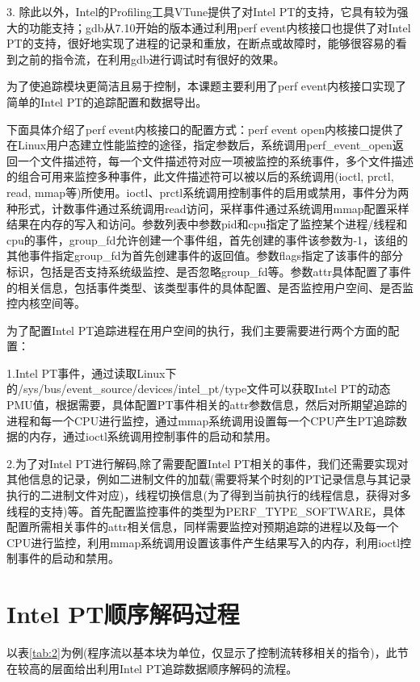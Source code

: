 3. 除此以外，Intel的Profiling工具VTune提供了对Intel PT的支持，它具有较为强大的功能支持；gdb从7.10开始的版本通过利用perf event内核接口也提供了对Intel PT的支持，很好地实现了进程的记录和重放，在断点或故障时，能够很容易的看到之前的指令流，在利用gdb进行调试时有很好的效果。

为了使追踪模块更简洁且易于控制，本课题主要利用了perf event内核接口实现了简单的Intel PT的追踪配置和数据导出。

下面具体介绍了perf event内核接口的配置方式：perf event open内核接口提供了在Linux用户态建立性能监控的途径，指定参数后，系统调用perf\_event\_open返回一个文件描述符，每一个文件描述符对应一项被监控的系统事件，多个文件描述的组合可用来监控多种事件，此文件描述符可以被以后的系统调用(ioctl, prctl, read, mmap等)所使用。ioctl、prctl系统调用控制事件的启用或禁用，事件分为两种形式，计数事件通过系统调用read访问，采样事件通过系统调用mmap配置采样结果在内存的写入和访问。参数列表中参数pid和cpu指定了监控某个进程/线程和cpu的事件，group\_fd允许创建一个事件组，首先创建的事件该参数为-1，该组的其他事件指定group\_fd为首先创建事件的返回值。参数flags指定了该事件的部分标识，包括是否支持系统级监控、是否忽略group\_fd等。参数attr具体配置了事件的相关信息，包括事件类型、该类型事件的具体配置、是否监控用户空间、是否监控内核空间等。

为了配置Intel PT追踪进程在用户空间的执行，我们主要需要进行两个方面的配置：

1.Intel PT事件，通过读取Linux下的/sys/bus/event\_source/devices/intel\_pt/type文件可以获取Intel PT的动态PMU值，根据需要，具体配置PT事件相关的attr参数信息，然后对所期望追踪的进程和每一个CPU进行监控，通过mmap系统调用设置每一个CPU产生PT追踪数据的内存，通过ioctl系统调用控制事件的启动和禁用。

2.为了对Intel PT进行解码,除了需要配置Intel PT相关的事件，我们还需要实现对其他信息的记录，例如二进制文件的加载(需要将某个时刻的PT记录信息与其记录执行的二进制文件对应)，线程切换信息(为了得到当前执行的线程信息，获得对多线程的支持)等。首先配置监控事件的类型为PERF\_TYPE\_SOFTWARE，具体配置所需相关事件的attr相关信息，同样需要监控对预期追踪的进程以及每一个CPU进行监控，利用mmap系统调用设置该事件产生结果写入的内存，利用ioctl控制事件的启动和禁用。

\iffalse
\section{Intel PT顺序解码过程}
以表\ref{tab:2}为例(程序流以基本块为单位，仅显示了控制流转移相关的指令)，此节在较高的层面给出利用Intel PT追踪数据顺序解码的流程。

